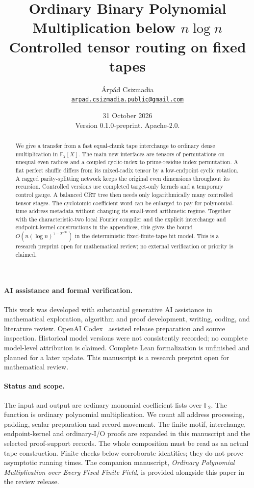 \documentclass[11pt]{article}
\title{Ordinary Binary Polynomial Multiplication below $n\log n$\\
\large Controlled tensor routing on fixed tapes}
\author{\'Arp\'ad Csizmadia\\
\small\href{mailto:arpad.csizmadia.public@gmail.com}{\texttt{arpad.csizmadia.public@gmail.com}}}
\date{31 October 2026\\ \small Version 0.1.0-preprint. Apache-2.0.}
\newcommand{\F}{\mathbb F}
\begin{document}
\maketitle
\begin{abstract}
We give a transfer from a fast equal-chunk tape interchange
to ordinary dense multiplication in $\F_2[X]$. The main new interfaces
are tensors of permutations on unequal even radices and a coupled
cyclic-index to prime-residue index permutation. A flat perfect shuffle
differs from its mixed-radix tensor by a low-endpoint cyclic rotation.
A ragged parity-splitting network keeps the original even dimensions
throughout its recursion. Controlled versions use completed target-only
kernels and a temporary control gauge. A balanced CRT tree then needs
only logarithmically many controlled tensor stages. The cyclotomic
coefficient word can be enlarged to pay for polynomial-time address
metadata without changing its small-word arithmetic regime. Together
with the characteristic-two local Fourier compiler and the explicit
interchange and endpoint-kernel constructions in the appendices, this gives
the bound $O(n(\log n)^{1-2^{-38}})$ in the deterministic
fixed-finite-tape bit model. This is a research preprint open for mathematical review;
no external verification or priority is claimed.
\end{abstract}

\paragraph{AI assistance and formal verification.}
This work was developed with substantial generative AI assistance in
mathematical exploration, algorithm and proof development, writing,
coding, and literature review. OpenAI Codex~\cite{CodexTool26}
assisted release preparation and source inspection. Historical
model versions were not consistently recorded; no complete
model-level attribution is claimed. Complete Lean formalization is unfinished
and planned for a later update. This manuscript is a research
preprint open for mathematical review.

\paragraph{Status and scope.}
The input and output are ordinary monomial coefficient lists over
$\F_2$. The function is ordinary polynomial multiplication. We count
all address processing, padding, scalar preparation and record movement.
The finite motif, interchange, endpoint-kernel and ordinary-I/O proofs are
expanded in this manuscript and the selected proof-support records.
The whole composition must be read as an actual tape construction.
Finite checks below corroborate identities; they do not prove asymptotic
running times. The companion manuscript, \emph{Ordinary Polynomial
Multiplication over Every Fixed Finite Field}, is provided alongside
this paper in the review release.
\end{document}
